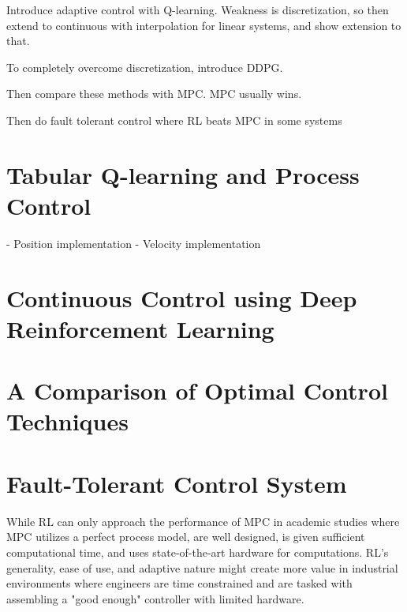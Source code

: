 %
% 

Introduce adaptive control with Q-learning.  Weakness is discretization, so then extend to continuous with interpolation for linear systems, and show extension to that.

To completely overcome discretization, introduce DDPG.

Then compare these methods with MPC. MPC usually wins.

Then do fault tolerant control where RL beats MPC in some systems

\section{Tabular Q-learning and Process Control}
- Position implementation
- Velocity implementation

\section{Continuous Control using Deep Reinforcement Learning}

\section{A Comparison of Optimal Control Techniques}

%
%
% 
%  
% 
% 
% 

\section{Fault-Tolerant Control System}
While RL can only approach the performance of MPC in academic studies where MPC utilizes a perfect process model, are well designed, is given sufficient computational time, and uses state-of-the-art hardware for computations.  RL's generality, ease of use, and adaptive nature might create more value in industrial environments where engineers are time constrained and are tasked with assembling a "good enough" controller with limited hardware.

